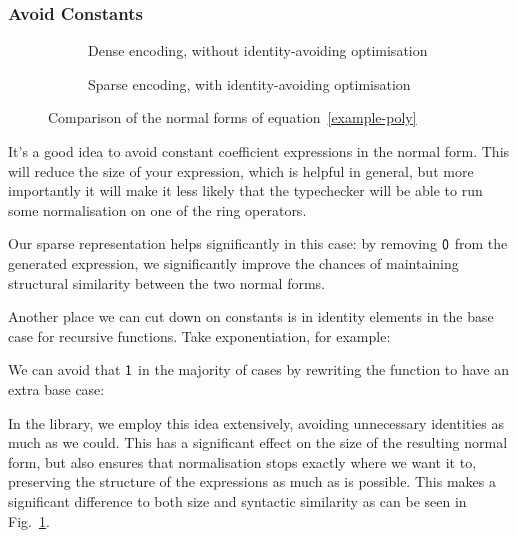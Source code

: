 \documentclass[acmsmall,review,anonymous]{acmart}\settopmatter{printfolios=true,printccs=false,printacmref=false}
\begin{document}
\subsubsection{Avoid Constants}
\begin{figure}[h]
  \centering
  \begin{subfigure}{0.4\textwidth}
    \centering
    \caption{Dense encoding, without identity-avoiding optimisation}
  \end{subfigure}
  \begin{subfigure}{0.4\textwidth}
    \centering
    \caption{Sparse encoding, with identity-avoiding optimisation}
  \end{subfigure}
  \caption{Comparison of the normal forms of equation~\ref{example-poly}}
  \label{normal-forms}
\end{figure}
It's a good idea to avoid constant coefficient expressions in the normal form.
This will reduce the size of your expression, which is helpful in general, but
more importantly it will make it less likely that the typechecker will be able
to run some normalisation on one of the ring operators.

Our sparse representation helps significantly in this case: by removing
\(\AgdaNumber{0}\) from the generated expression, we significantly improve the
chances of maintaining structural similarity between the two normal forms.

Another place we can cut down on constants is in identity elements in the base
case for recursive functions. Take exponentiation, for example:
\begin{center}
\end{center}
We can avoid that \(\AgdaNumber{1}\) in the majority of cases by rewriting the
function to have an extra base case:
\begin{multicols}{2}
  \centering
\end{multicols}
In the library, we employ this idea extensively, avoiding unnecessary identities
as much as we could. This has a significant effect on the size of the resulting
normal form, but also ensures that normalisation stops exactly where we want it
to, preserving the structure of the expressions as much as is possible. This
makes a significant difference to both size and syntactic
similarity as can be seen in Fig.~\ref{normal-forms}.
\end{document}
